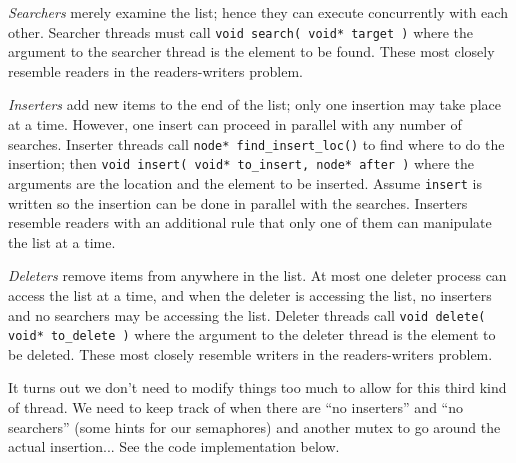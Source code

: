 \textit{Searchers} merely examine the list; hence they can execute concurrently with each other. Searcher threads must call \texttt{void search( void* target )} where the argument to the searcher thread is the element to be found. These most closely resemble readers in the readers-writers problem.

\textit{Inserters} add new items to the end of the list; only one insertion may take place at a time. However, one insert can proceed in parallel with any number of searches. Inserter threads call \texttt{node* find\_insert\_loc()} to find where to do the insertion; then \texttt{void insert( void* to\_insert, node* after )} where the arguments are the location and the element to be inserted. Assume \texttt{insert} is written so the insertion can be done in parallel with the searches. Inserters resemble readers with an additional rule that only one of them can manipulate the list at a time.

\textit{Deleters} remove items from anywhere in the list. At most one deleter process can access the list at a time, and when the deleter is accessing the list, no inserters and no searchers may be accessing the list. Deleter threads call \texttt{void delete( void* to\_delete )} where the argument to the deleter thread is the element to be deleted. These most closely resemble writers in the readers-writers problem.

It turns out we don't need to modify things too much to allow for this third kind of thread. We need to keep track of when there are ``no inserters'' and ``no searchers'' (some hints for our semaphores) and another mutex to go around the actual insertion... See the code implementation below.

